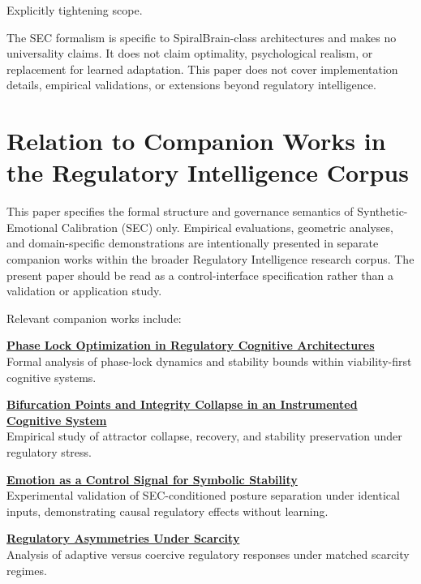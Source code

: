 \documentclass[12pt,a4paper]{article}
\begin{document}
Explicitly tightening scope.

The SEC formalism is specific to SpiralBrain-class architectures and makes no universality claims. It does not claim optimality, psychological realism, or replacement for learned adaptation. This paper does not cover implementation details, empirical validations, or extensions beyond regulatory intelligence.

\section{Relation to Companion Works in the Regulatory Intelligence Corpus}

This paper specifies the formal structure and governance semantics of Synthetic-Emotional Calibration (SEC) only. Empirical evaluations, geometric analyses, and domain-specific demonstrations are intentionally presented in separate companion works within the broader Regulatory Intelligence research corpus. The present paper should be read as a control-interface specification rather than a validation or application study.

Relevant companion works include:

\medskip
\noindent\textbf{\href{https://github.com/jhcragin/SpiralBrain-v3.0-public/tree/main/Phase\%20Lock\%20Optimization\%20in\%20Regulatory\%20Cognitive\%20Architectures}{Phase Lock Optimization in Regulatory Cognitive Architectures}} \\
Formal analysis of phase-lock dynamics and stability bounds within viability-first cognitive systems.
 
\medskip
\noindent\textbf{\href{https://github.com/jhcragin/SpiralBrain-v3.0-public/tree/main/bifurcation_integrity_collapse}{Bifurcation Points and Integrity Collapse in an Instrumented Cognitive System}} \\
Empirical study of attractor collapse, recovery, and stability preservation under regulatory stress.

\medskip
\noindent\textbf{\href{https://github.com/jhcragin/SpiralBrain-v3.0-public/tree/main/Emotion\%20as\%20a\%20Control\%20Signal\%20for\%20Symbolic\%20Stability}{Emotion as a Control Signal for Symbolic Stability}} \\
Experimental validation of SEC-conditioned posture separation under identical inputs, demonstrating causal regulatory effects without learning.

\medskip
\noindent\textbf{\href{https://github.com/jhcragin/SpiralBrain-v3.0-public/tree/main/RegulatoryAsymmetriesUnderScarcity}{Regulatory Asymmetries Under Scarcity}} \\
Analysis of adaptive versus coercive regulatory responses under matched scarcity regimes.
\end{document}
